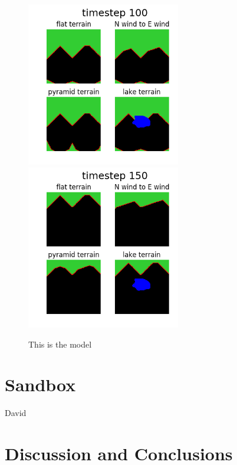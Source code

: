 \documentclass{article}
\begin{document}
\begin{figure}
\includegraphics[width=0.6\textwidth]{figures/multi_im099.png}\includegraphics[width=0.6\textwidth]{figures/multi_im149.png}
\caption{This is the model\label{fig:modelims}}
\end{figure}


\section{Sandbox}
David
\section{Discussion and Conclusions}
\end{document}

